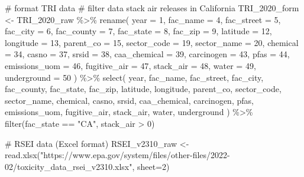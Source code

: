 \documentclass[
  letterpaper,
  DIV=11,
  numbers=noendperiod]{scrartcl}
\newenvironment{Shaded}{\begin{snugshade}}{\end{snugshade}}
\newcommand{\AttributeTok}[1]{\textcolor[rgb]{0.40,0.45,0.13}{#1}}
\newcommand{\CommentTok}[1]{\textcolor[rgb]{0.37,0.37,0.37}{#1}}
\newcommand{\DecValTok}[1]{\textcolor[rgb]{0.68,0.00,0.00}{#1}}
\newcommand{\FunctionTok}[1]{\textcolor[rgb]{0.28,0.35,0.67}{#1}}
\newcommand{\NormalTok}[1]{\textcolor[rgb]{0.00,0.23,0.31}{#1}}
\newcommand{\OtherTok}[1]{\textcolor[rgb]{0.00,0.23,0.31}{#1}}
\newcommand{\SpecialCharTok}[1]{\textcolor[rgb]{0.37,0.37,0.37}{#1}}
\newcommand{\StringTok}[1]{\textcolor[rgb]{0.13,0.47,0.30}{#1}}
\begin{document}
\begin{Shaded}
\begin{Highlighting}[]
\CommentTok{\# format TRI data}
\CommentTok{\# filter data stack air releases in California}
\NormalTok{TRI\_2020\_form }\OtherTok{\textless{}{-}}\NormalTok{ TRI\_2020\_raw }\SpecialCharTok{\%\textgreater{}\%}
  \FunctionTok{rename}\NormalTok{(}
    \AttributeTok{year =} \DecValTok{1}\NormalTok{,}
    \AttributeTok{fac\_name =} \DecValTok{4}\NormalTok{,}
    \AttributeTok{fac\_street =} \DecValTok{5}\NormalTok{,}
    \AttributeTok{fac\_city =} \DecValTok{6}\NormalTok{,}
    \AttributeTok{fac\_county =} \DecValTok{7}\NormalTok{,}
    \AttributeTok{fac\_state =} \DecValTok{8}\NormalTok{,}
    \AttributeTok{fac\_zip =} \DecValTok{9}\NormalTok{,}
    \AttributeTok{latitude =} \DecValTok{12}\NormalTok{,}
    \AttributeTok{longitude =} \DecValTok{13}\NormalTok{,}
    \AttributeTok{parent\_co =} \DecValTok{15}\NormalTok{,}
    \AttributeTok{sector\_code =} \DecValTok{19}\NormalTok{,}
    \AttributeTok{sector\_name =} \DecValTok{20}\NormalTok{,}
    \AttributeTok{chemical =} \DecValTok{34}\NormalTok{,}
    \AttributeTok{casno =} \DecValTok{37}\NormalTok{,}
    \AttributeTok{srsid =} \DecValTok{38}\NormalTok{,}
    \AttributeTok{caa\_chemical =} \DecValTok{39}\NormalTok{,}
    \AttributeTok{carcinogen =} \DecValTok{43}\NormalTok{,}
    \AttributeTok{pfas =} \DecValTok{44}\NormalTok{,}
    \AttributeTok{emissions\_uom =} \DecValTok{46}\NormalTok{,}
    \AttributeTok{fugitive\_air =} \DecValTok{47}\NormalTok{,}
    \AttributeTok{stack\_air =} \DecValTok{48}\NormalTok{,}
    \AttributeTok{water =} \DecValTok{49}\NormalTok{,}
    \AttributeTok{underground =} \DecValTok{50}
\NormalTok{  ) }\SpecialCharTok{\%\textgreater{}\%}
  \FunctionTok{select}\NormalTok{(}
\NormalTok{    year,}
\NormalTok{    fac\_name,}
\NormalTok{    fac\_street,}
\NormalTok{    fac\_city,}
\NormalTok{    fac\_county,}
\NormalTok{    fac\_state,}
\NormalTok{    fac\_zip,}
\NormalTok{    latitude,}
\NormalTok{    longitude,}
\NormalTok{    parent\_co,}
\NormalTok{    sector\_code,}
\NormalTok{    sector\_name,}
\NormalTok{    chemical,}
\NormalTok{    casno,}
\NormalTok{    srsid,}
\NormalTok{    caa\_chemical,}
\NormalTok{    carcinogen,}
\NormalTok{    pfas,}
\NormalTok{    emissions\_uom,}
\NormalTok{    fugitive\_air,}
\NormalTok{    stack\_air,}
\NormalTok{    water,}
\NormalTok{    underground}
\NormalTok{  ) }\SpecialCharTok{\%\textgreater{}\%}
  \FunctionTok{filter}\NormalTok{(fac\_state }\SpecialCharTok{==} \StringTok{"CA"}\NormalTok{,}
\NormalTok{         stack\_air }\SpecialCharTok{\textgreater{}} \DecValTok{0}\NormalTok{)}

\CommentTok{\# RSEI data (Excel format)}
\NormalTok{RSEI\_v2310\_raw }\OtherTok{\textless{}{-}} \FunctionTok{read.xlsx}\NormalTok{(}\StringTok{"https://www.epa.gov/system/files/other{-}files/2022{-}02/toxicity\_data\_rsei\_v2310.xlsx"}\NormalTok{, }\AttributeTok{sheet=}\DecValTok{2}\NormalTok{)}


\end{Highlighting}
\end{Shaded}
\end{document}
